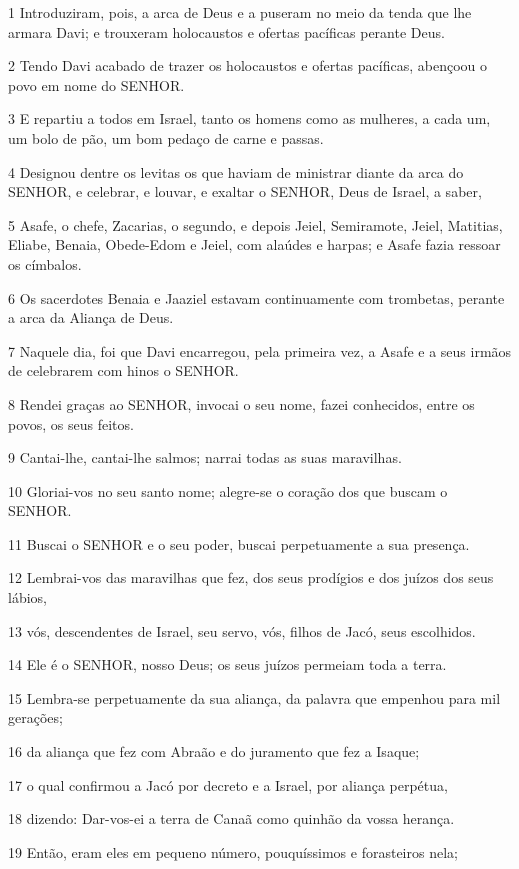 \par 1 Introduziram, pois, a arca de Deus e a puseram no meio da tenda que lhe armara Davi; e trouxeram holocaustos e ofertas pacíficas perante Deus.
\par 2 Tendo Davi acabado de trazer os holocaustos e ofertas pacíficas, abençoou o povo em nome do SENHOR.
\par 3 E repartiu a todos em Israel, tanto os homens como as mulheres, a cada um, um bolo de pão, um bom pedaço de carne e passas.
\par 4 Designou dentre os levitas os que haviam de ministrar diante da arca do SENHOR, e celebrar, e louvar, e exaltar o SENHOR, Deus de Israel, a saber,
\par 5 Asafe, o chefe, Zacarias, o segundo, e depois Jeiel, Semiramote, Jeiel, Matitias, Eliabe, Benaia, Obede-Edom e Jeiel, com alaúdes e harpas; e Asafe fazia ressoar os címbalos.
\par 6 Os sacerdotes Benaia e Jaaziel estavam continuamente com trombetas, perante a arca da Aliança de Deus.
\par 7 Naquele dia, foi que Davi encarregou, pela primeira vez, a Asafe e a seus irmãos de celebrarem com hinos o SENHOR.
\par 8 Rendei graças ao SENHOR, invocai o seu nome, fazei conhecidos, entre os povos, os seus feitos.
\par 9 Cantai-lhe, cantai-lhe salmos; narrai todas as suas maravilhas.
\par 10 Gloriai-vos no seu santo nome; alegre-se o coração dos que buscam o SENHOR.
\par 11 Buscai o SENHOR e o seu poder, buscai perpetuamente a sua presença.
\par 12 Lembrai-vos das maravilhas que fez, dos seus prodígios e dos juízos dos seus lábios,
\par 13 vós, descendentes de Israel, seu servo, vós, filhos de Jacó, seus escolhidos.
\par 14 Ele é o SENHOR, nosso Deus; os seus juízos permeiam toda a terra.
\par 15 Lembra-se perpetuamente da sua aliança, da palavra que empenhou para mil gerações;
\par 16 da aliança que fez com Abraão e do juramento que fez a Isaque;
\par 17 o qual confirmou a Jacó por decreto e a Israel, por aliança perpétua,
\par 18 dizendo: Dar-vos-ei a terra de Canaã como quinhão da vossa herança.
\par 19 Então, eram eles em pequeno número, pouquíssimos e forasteiros nela;
